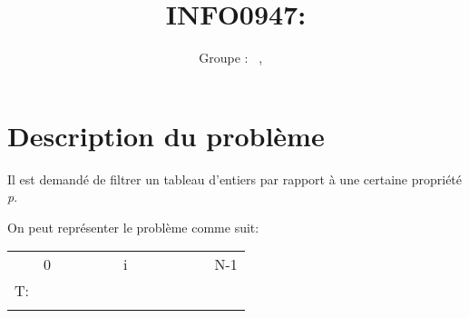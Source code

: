 \documentclass[a4paper, 11pt, oneside]{article}
\title{INFO0947: \intitule}
\author{Groupe \GrNbr : \PrenomUN~\textsc{\NomUN}, \PrenomDEUX~\textsc{\NomDEUX}}
\date{}
\newcommand{\tablemat}{~}
\renewcommand{\tablemat}{\tableofcontents}
\begin{document}
\maketitle
\newpage
\tablemat
\newpage


\section{Description du problème}

Il est demandé de filtrer un tableau d'entiers par rapport à une certaine propriété \textit{p}.

On peut représenter le problème comme suit:

\begin{table}[!h]
\centering
\begin{tabular}{lllllllllllll}
\multicolumn{1}{l|}{}   & 0                        &                          &                          &                          &                          & \multicolumn{1}{r|}{i}                        &                          &                          &                          &                          &                          & \multicolumn{1}{r|}{N-1}                      \\ \cline{2-13} 
\multicolumn{1}{r|}{T:} & \cellcolor[HTML]{3531FF} & \cellcolor[HTML]{3531FF} & \cellcolor[HTML]{3531FF} & \cellcolor[HTML]{3531FF} & \cellcolor[HTML]{3531FF} & \multicolumn{1}{l|}{\cellcolor[HTML]{3531FF}} & \cellcolor[HTML]{9A0000} & \cellcolor[HTML]{9A0000} & \cellcolor[HTML]{9A0000} & \cellcolor[HTML]{9A0000} & \cellcolor[HTML]{9A0000} & \multicolumn{1}{l|}{\cellcolor[HTML]{9A0000}} \\ \cline{2-13} 
                        &                          &                          &                          &                          &                          &                                               &                          &                          &                          &                          &                          &                                              
\end{tabular}
\end{table}
\end{document}
